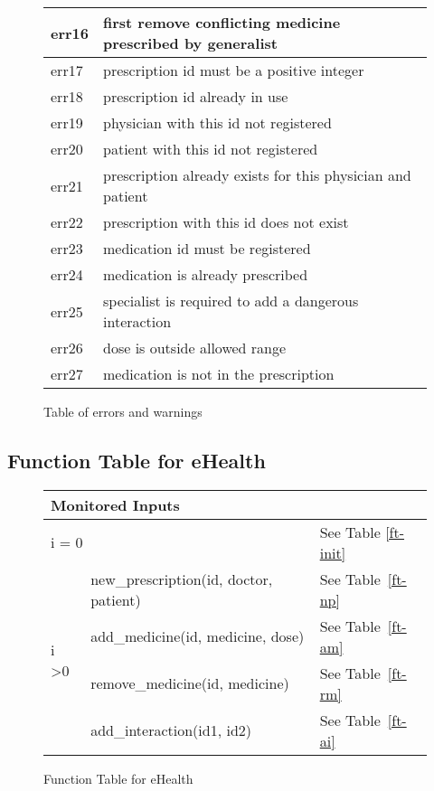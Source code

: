 \begin{figure}[]
\begin{center}
\begin{tabular}{|l|l|}
err16 & first remove conflicting medicine prescribed by generalist \\ \hline
err17 & prescription id must be a positive integer                 \\ \hline
err18 & prescription id already in use                             \\ \hline
err19 & physician with this id not registered                      \\ \hline
err20 & patient with this id not registered                        \\ \hline
err21 & prescription already exists for this physician and patient \\ \hline
err22 & prescription with this id does not exist                   \\ \hline
err23 & medication id must be registered                           \\ \hline
err24 & medication is already prescribed                           \\ \hline
err25 & specialist is required to add a dangerous interaction      \\ \hline
err26 & dose is outside allowed range                              \\ \hline
err27 & medication is not in the prescription                      \\ \hline
\end{tabular}
\caption{Table of errors and warnings}
\label{err-table}
\end{center}
\end{figure}

\newpage


\subsection{Function Table for eHealth}
\begin{figure}[h]
\begin{center}
\begin{tabular}{|l|l|l|}
\hline
\multicolumn{2}{|l|}{Monitored Inputs}                &             \\ \hline
\multicolumn{2}{|l|}{i = 0}                           & See Table \ref{ft-init} \\ \hline
\multirow{4}{*}{i \textgreater 0} & new\_prescription(id, doctor, patient) & See Table~\ref{ft-np} \\ \cline{2-3} 
                                  & add\_medicine(id, medicine, dose)     & See Table~\ref{ft-am} \\ \cline{2-3} 
                                  & remove\_medicine(id, medicine) & See Table~\ref{ft-rm} \\ \cline{2-3} 
                                  & add\_interaction(id1, id2)  & See Table~\ref{ft-ai} \\ \hline
\end{tabular}
\caption{Function Table for eHealth}
\label{ft-ehealth}
\end{center}
\end{figure}

